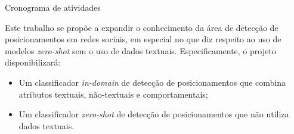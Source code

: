 \documentclass[
	12pt, oneside, a4paper, english, brazil
]{abntex2ppgsi}
\begin{document}
\begin{quadro}[H]
	\centering
	\caption{Cronograma de atividades}
	\label{qua:cronograma}
\end{quadro}

Este trabalho se propõe a expandir o conhecimento da área de detecção de posicionamentos em redes sociais, em especial no que diz respeito ao uso de modelos {\em zero-shot} sem o uso de dados textuais. Especificamente, o projeto disponibilizará:

\begin{itemize}
    \item Um classificador {\em in-domain} de detecção de posicionamentos que combina atributos textuais, não-textuais e comportamentais;
    \item Um classificador {\em zero-shot} de detecção de posicionamentos que não utiliza dados textuais.
\end{itemize}
\end{document}
